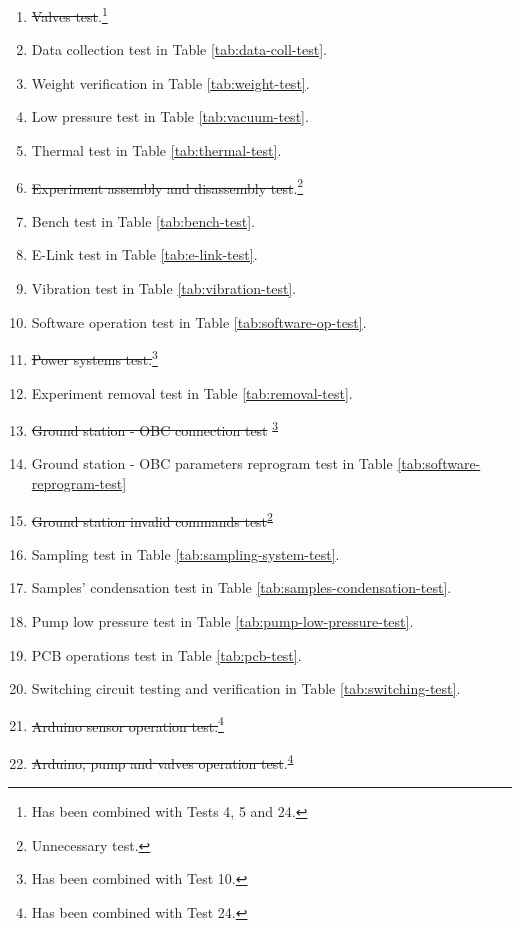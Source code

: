 \documentclass[a4paper,12pt,twoside]{article}
\begin{document}
\begin{enumerate}
    \item \st{Valves test}.\footnote{Has been combined with Tests 4, 5 and 24.\label{fn:test-combined}}
    \item Data collection test in Table \ref{tab:data-coll-test}.
    \item Weight verification in Table \ref{tab:weight-test}.
    \item Low pressure test in Table \ref{tab:vacuum-test}.
    \item Thermal test in Table \ref{tab:thermal-test}.
    \item \st{Experiment assembly and disassembly test}.\footnote{Unnecessary test.\label{fn:test-removed}}
    \item Bench test in Table \ref{tab:bench-test}.
    \item E-Link test in Table \ref{tab:e-link-test}.
    \item Vibration test in Table \ref{tab:vibration-test}.
    \item Software operation test in Table \ref{tab:software-op-test}.
    \item \st{Power systems test.}\footnote{Has been combined with Test 10.\label{fn:test-combined10}}
    \item Experiment removal test in Table \ref{tab:removal-test}.
    \item \st{Ground station - OBC connection test} \textsuperscript{\ref{fn:test-combined10}}
    \item Ground station - OBC parameters reprogram test in Table \ref{tab:software-reprogram-test}
    \item \st{Ground station invalid commands test}\textsuperscript{\ref{fn:test-removed}}
    \item Sampling test in Table \ref{tab:sampling-system-test}.
    \item Samples' condensation test in Table \ref{tab:samples-condensation-test}.
    \item Pump low pressure test in Table \ref{tab:pump-low-pressure-test}.
    \item PCB operations test in Table \ref{tab:pcb-test}.
    \item Switching circuit testing and verification in Table \ref{tab:switching-test}.
    \item \st{Arduino sensor operation test.}\footnote{Has been combined with Test 24.\label{fn:test-combined24}}
    \item \st{Arduino, pump and valves operation test}.\textsuperscript{\ref{fn:test-combined24}}

\end{enumerate}
\end{document}
